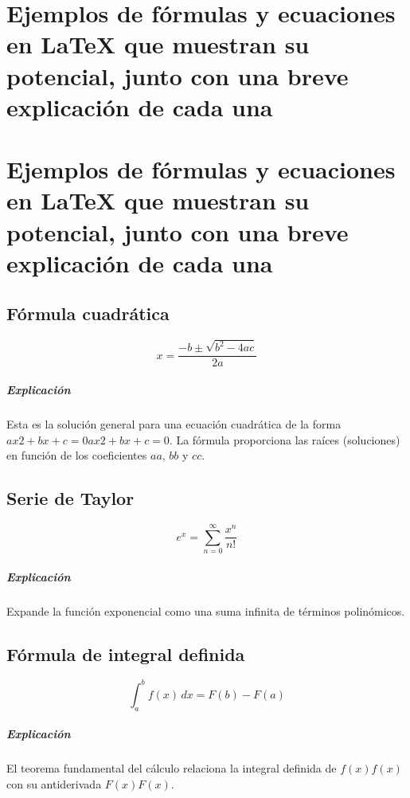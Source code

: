 \ifPDF
\chapter{Ejemplos de fórmulas y ecuaciones en LaTeX que muestran su potencial, junto con una breve explicación de cada una}
\setcounter{PrimPag}{\theCurrentPage}
	\else
	\ifHTMLEPUB
	\chapter{Ejemplos de fórmulas y ecuaciones en LaTeX que muestran su potencial, junto con una breve explicación de cada una}
	\fi
\fi

\section{Fórmula cuadrática}

\[
x = \frac{-b \pm \sqrt{b^2 - 4ac}}{2a}
\]

\paragraph*{Explicación} Esta es la solución general para una ecuación cuadrática de la forma $ax2+bx+c=0ax2+bx+c=0$. La fórmula proporciona las raíces (soluciones) en función de los coeficientes $aa$, $bb$ y $cc$.

\section{Serie de Taylor}

\[
e^x = \sum_{n=0}^{\infty} \frac{x^n}{n!}
\]

\paragraph*{Explicación} Expande la función exponencial como una suma infinita de términos polinómicos.

\section{Fórmula de integral definida}

\[
\int_{a}^{b} f(x) \, dx = F(b) - F(a)
\]

\paragraph*{Explicación} El teorema fundamental del cálculo relaciona la integral definida de $f(x)f(x)$ con su antiderivada $F(x)F(x)$.

